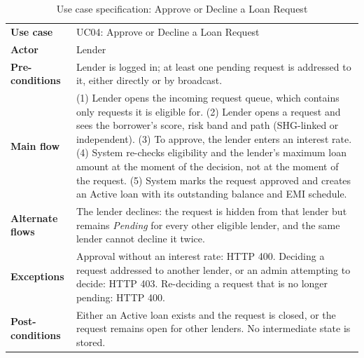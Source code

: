 \documentclass[11pt,a4paper]{article}
\begin{document}
\begin{table}[H]
\centering
\caption{Use case specification: Approve or Decline a Loan Request}
\label{tab:uc4}
\small
\begin{tabular}{@{}L{3.1cm}L{11.3cm}@{}}
\toprule
\textbf{Use case} & UC04: Approve or Decline a Loan Request\\
\textbf{Actor} & Lender\\
\textbf{Pre-conditions} & Lender is logged in; at least one pending request is addressed to it, either directly or by broadcast.\\
\textbf{Main flow} & (1) Lender opens the incoming request queue, which contains only requests it is eligible for. (2) Lender opens a request and sees the borrower's score, risk band and path (SHG-linked or independent). (3) To approve, the lender enters an interest rate. (4) System re-checks eligibility and the lender's maximum loan amount at the moment of the decision, not at the moment of the request. (5) System marks the request approved and creates an Active loan with its outstanding balance and EMI schedule.\\
\textbf{Alternate flows} & The lender declines: the request is hidden from that lender but remains \emph{Pending} for every other eligible lender, and the same lender cannot decline it twice.\\
\textbf{Exceptions} & Approval without an interest rate: HTTP 400. Deciding a request addressed to another lender, or an admin attempting to decide: HTTP 403. Re-deciding a request that is no longer pending: HTTP 400.\\
\textbf{Post-conditions} & Either an Active loan exists and the request is closed, or the request remains open for other lenders. No intermediate state is stored.\\
\bottomrule
\end{tabular}
\end{table}
\end{document}
